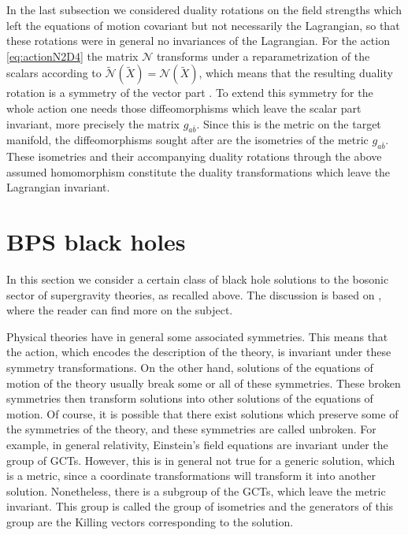 \documentclass[12pt,twoside]{book}
\begin{document}
In the last subsection we considered duality rotations on the field strengths which left the equations of motion covariant but not necessarily the Lagrangian, so that these rotations were in general no invariances of the Lagrangian. For the action \eqref{eq:actionN2D4} the matrix $\mathcal{N}$ transforms under a reparametrization of the scalars according to $\tilde{\mathcal{N}}(\tilde{X}) = \mathcal{N}(\tilde{X})$, which means that the resulting duality rotation is a symmetry of the vector part \cite{Ceresole:1995fk}. To extend this symmetry for the whole action one needs those diffeomorphisms which leave the scalar part invariant, more precisely the matrix $g_{a\bar{b}}$. Since this is the metric on the target manifold, the diffeomorphisms sought after are the isometries of the metric $g_{a\bar{b}}$. These isometries and their accompanying duality rotations through the above assumed homomorphism constitute the duality transformations which leave the Lagrangian invariant.

\section{BPS black holes}

In this section we consider a certain class of black hole solutions to the bosonic sector of supergravity theories, as recalled above. The discussion is based on \cite{DAuria:uq,Ortin:gravity,string-bbs}, where the reader can find more on the subject.\newline

\noindent
Physical theories have in general some associated symmetries. This means that the action, which encodes the description of the theory, is invariant under these symmetry transformations. On the other hand, solutions of the equations of motion of the theory usually break some or all of these symmetries. These broken symmetries then transform solutions into other solutions of the equations of motion. Of course, it is possible that there exist solutions which preserve some of the symmetries of the theory, and these symmetries are called unbroken. For example, in general relativity, Einstein's field equations are invariant under the group of GCTs. However, this is in general not true for a generic solution, which is a metric, since a coordinate transformations will transform it into another solution. Nonetheless, there is a subgroup of the GCTs, which leave the metric invariant. This group is called the group of isometries and the generators of this group are the Killing vectors corresponding to the solution.\newline
\end{document}

